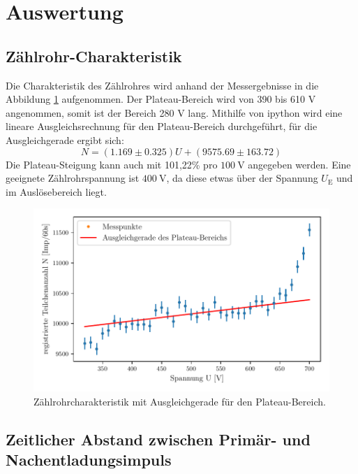 \section{Auswertung}
\label{sec:Auswertung}

\subsection{Zählrohr-Charakteristik}
\label{subsec:Zählrohr-Charakteristik}
Die Charakteristik des Zählrohres wird anhand der Messergebnisse in die Abbildung \ref{fig:Charakteristik} aufgenommen.
Der Plateau-Bereich wird von 390 bis 610 $\si{\volt}$ angenommen, somit ist der Bereich 280 $\si{\volt}$ lang.
Mithilfe von ipython wird eine lineare Ausgleichsrechnung für den Plateau-Bereich durchgeführt, für die Ausgleichgerade ergibt sich:
\begin{equation*}
  N = (1.169 \pm 0.325)U + (9575.69 \pm 163.72)
\end{equation*}
Die Plateau-Steigung kann auch mit 101,22\% pro $\SI{100}{\volt}$ angegeben werden.
Eine geeignete Zählrohrspannung ist $\SI{400}{\volt}$, da diese etwas über der Spannung $U_\text{E}$ und im Auslösebereich liegt.
\begin{figure}
  \centering
  \includegraphics{Plateau_Gerade.pdf}
  \caption{Zählrohrcharakteristik mit Ausgleichgerade für den Plateau-Bereich.}
  \label{fig:Charakteristik}
\end{figure}

\subsection{Zeitlicher Abstand zwischen Primär- und Nachentladungsimpuls}
\label{subsec:Primär_Nachentladung}

